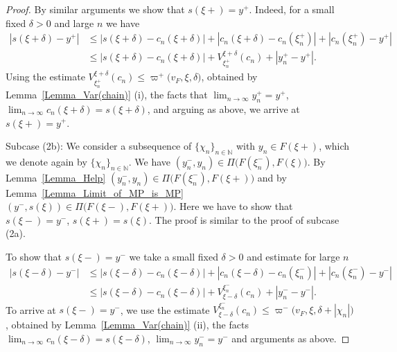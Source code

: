 \documentclass[final,3p,mathptmx]{article}%
\newcommand{\N}{{\mathbb N}}
\newcommand{\Pair}[2]{\Pi \big ( {#1},{#2} \big )}
\newcommand{\Var}[3]{V_{#1}^{#2}(#3) }
\newcommand{\NewLeftLocalModul}[3]{\varpi^{-}\big( {#1},{#2},{#3} \big)}
\newcommand{\NewRightLocalModul}[3]{\varpi^{+}\big( {#1},{#2},{#3} \big)}
\begin{document}
{{{\begin{proof}
	By similar arguments we show that $s(\xi+)=y^+$. Indeed, for a small fixed $\delta >0$ 
	and large $n$ we have 
	\begin{equation}\label{Formula_11} \nonumber
		\begin{split}
			|s(\xi+\delta)-y^{+}| & \le
			|s(\xi+\delta)-c_n(\xi+\delta)|+|c_n(\xi+\delta) - c_n(\xi_n^+)|+|c_n(\xi_n^+) - y^{+}| \\&
			\le |s(\xi+\delta)-c_n(\xi+\delta)|+ \Var{\xi_n^+}{\xi+\delta}{c_n} +|y_n^{+}-y^{+}|.
		\end{split}
	\end{equation}
		Using the estimate $\Var{\xi_n^+}{\xi+\delta}{c_n} \le  \NewRightLocalModul{v_F}{\xi}{\delta}$, obtained by Lemma~\ref{Lemma_Var(chain)} (i), the facts that ${\lim_{n \to \infty} y_n^+ = y^+}$, 
		${\lim_{n \to \infty} c_n(\xi + \delta) = s(\xi + \delta)}$, and arguing as above, we arrive at
		$s(\xi+)=y^+$.
		
	\medskip
	
	Subcase (2b): We consider a subsequence of   $\{\chi_n\}_{n \in \N}$ with $y_n \in  F(\xi+)$, which we denote again by $\{\chi_n\}_{n \in \N}$. 
	We have  $(y_n^-, y_n) \in \Pair{F(\xi_n^-)}{F(\xi)} $. By Lemma~\ref{Lemma_Help} $(y_n^-, y_n) \in \Pair{F(\xi_n^-)}{F(\xi+)}$ and by Lemma~\ref{Lemma_Limit_of_MP_is_MP} $(y^-, s(\xi) ) \in \Pair{F(\xi-)}{F(\xi+)}$.
	Here we have to show that $s(\xi-)=y^-$, $s(\xi+)=s(\xi)$. The proof is similar to the proof of subcase (2a).
	
	To show that $s(\xi-)=y^-$ we take a small fixed $\delta > 0$ and estimate for large $n$ 
	\begin{equation}\label{Formula_22} \nonumber
		\begin{split}
			|s(\xi-\delta)-y^{-}| & \le
			|s(\xi-\delta)-c_n(\xi-\delta)|+|c_n(\xi-\delta) - c_n(\xi_n^-)|+|c_n(\xi_n^-) - y^{-}| \\&
			\le |s(\xi-\delta)-c_n(\xi-\delta)|+ \Var{\xi-\delta}{\xi_n^-}{c_n} +|y_n^{-}-y^{-}|.
		\end{split}
	\end{equation}
		To arrive at $ s(\xi-)=y^-$, we use the estimate $V_{\xi-\delta}^{\xi_n^-}(c_n) \le  \NewLeftLocalModul{v_F}{\xi}{\delta + |\chi_n|}$, obtained by Lemma~\ref{Lemma_Var(chain)} (ii), the facts $\lim_{n \to \infty} c_n(\xi - \delta) = s(\xi - \delta)$, $\lim_{n \to \infty} y_n^- = y^-$ and arguments as above.
	
	
	
	

\end{proof}}}}
\end{document}
